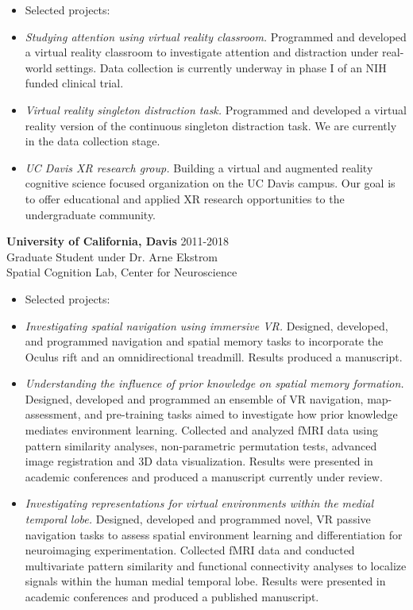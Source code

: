 \documentclass[line,margin,10pt]{res}
\begin{document}
\begin{resume}
\begin{itemize} \itemsep -2pt
\item  []Selected projects:
\item \emph{Studying attention using virtual reality classroom.} Programmed and developed a virtual reality classroom to investigate attention and distraction under real-world settings. Data collection is currently underway in phase I of an NIH funded clinical trial.
\item \emph{Virtual reality singleton distraction task.} Programmed and developed a virtual reality version of the continuous singleton distraction task. We are currently in the data collection stage.
\item \emph{UC Davis XR research group.} Building a virtual and augmented reality cognitive science focused organization on the UC Davis campus. Our goal is to offer educational and applied XR research opportunities to the undergraduate community.
\end{itemize}

\textbf{University of California, Davis} \hfill 2011-2018 \\
Graduate Student under Dr. Arne Ekstrom\\
Spatial Cognition Lab, Center for Neuroscience
\begin{itemize} \itemsep -2pt
\item  []Selected projects:
	\item \emph{Investigating spatial navigation using immersive VR.} Designed, developed, and programmed navigation and spatial memory tasks to incorporate the Oculus rift and an omnidirectional treadmill. Results produced a manuscript. 
\item \emph{Understanding the influence of prior knowledge on spatial memory formation.} Designed, developed and programmed an ensemble of VR navigation, map-assessment, and pre-training tasks aimed to investigate how prior knowledge mediates environment learning. Collected and analyzed fMRI data using pattern similarity analyses, non-parametric permutation tests, advanced image registration and 3D data visualization. Results were presented in academic conferences and produced a manuscript currently under review.
\item \emph{Investigating representations for virtual environments within the medial temporal lobe.} Designed, developed and programmed novel, VR passive navigation tasks to assess spatial environment learning and differentiation for neuroimaging experimentation. Collected fMRI data and conducted multivariate pattern similarity and functional connectivity analyses to localize signals within the human medial temporal lobe. Results were presented in academic conferences and produced a published manuscript.
\end{itemize} 


\end{resume}
\end{document}
